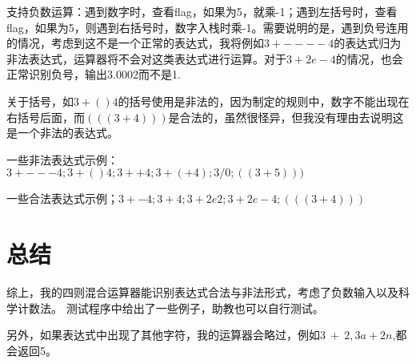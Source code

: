 \documentclass[UTF8]{ctexart}
\begin{document}
\hspace{0em}支持负数运算：遇到数字时，查看flag，如果为5，就乘-1；遇到左括号时，查看flag，如果为5，则遇到右括号时，数字入栈时乘-1。需要说明的是，遇到负号连用的情况，考虑到这不是一个正常的表达式，我将例如$3+----4$的表达式归为非法表达式，运算器将不会对这类表达式进行运算。对于$3+2e-4$的情况，也会正常识别负号，输出3.0002而不是1.

\hspace{0em}关于括号，如$3+()4$的括号使用是非法的，因为制定的规则中，数字不能出现在右括号后面，而$(((3+4)))$是合法的，虽然很怪异，但我没有理由去说明这是一个非法的表达式。

一些非法表达式示例：$3+---4;3+()4;3++4;3+(+4);3/0;((3+5)))$

一些合法表达式示例；$3+-4;3+4;3+2e2;3+2e-4;(((3+4)))$




\section{总结}
\hspace{0em}综上，我的四则混合运算器能识别表达式合法与非法形式，考虑了负数输入以及科学计数法。
测试程序中给出了一些例子，助教也可以自行测试。

另外，如果表达式中出现了其他字符，我的运算器会略过，例如$3\ +\ 2,3a+2n$,都会返回5。
\end{document}
